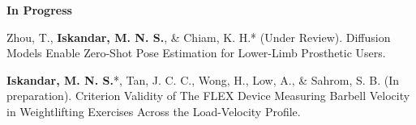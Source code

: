 \documentclass[../main.tex]{subfiles}
\begin{document}
        \textbf{In Progress}
        \def\labelprefix{P}
        \begin{etaremune}                     
            \item\label{article: diffusion_openpose}{Zhou, T., \textbf{Iskandar, M. N. S.}, \& Chiam, K. H.* (Under Review). Diffusion Models Enable Zero-Shot Pose Estimation for Lower-Limb Prosthetic Users. \href{https://arxiv.org/abs/2312.07854}{\faFilePdfO}}
            
            \item\label{article: fyp}{\textbf{Iskandar, M. N. S.}*, Tan, J. C. C., Wong, H., Low, A., \& Sahrom, S. B. (In preparation). Criterion Validity of The FLEX Device Measuring Barbell Velocity in Weightlifting Exercises Across the Load-Velocity Profile. \href{https://github.com/Shahril-Iskandar/publication-validity-flex-vbt}{\faGithub}}
        \end{etaremune}
        
  \resumeSubHeadingListEnd
\end{document}
